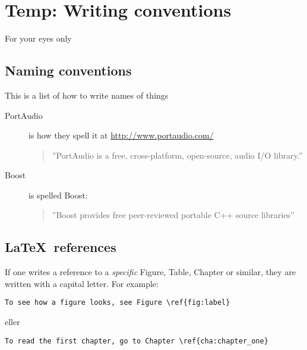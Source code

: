 \chapter*{Temp: Writing conventions}
For your eyes only
\section*{Naming conventions}
This is a list of how to write names of things

\begin{description}
  \item[PortAudio] is how they spell it at \url{http://www.portaudio.com/} \begin{quote}''PortAudio is a free, cross-platform, open-source, audio I/O library.''\end{quote}
  \item[Boost] is spelled Boost: \begin{quote}''Boost provides free peer-reviewed portable C++ source libraries''\end{quote}
\end{description}

\section*{\LaTeX\ references}
If one writes a reference to a \emph{specific} Figure, Table, Chapter or similar, they are written with a capital letter. For example:
\begin{verbatim}
To see how a figure looks, see Figure \ref{fig:label}
\end{verbatim}
eller
\begin{verbatim}
To read the first chapter, go to Chapter \ref{cha:chapter_one}
\end{verbatim}